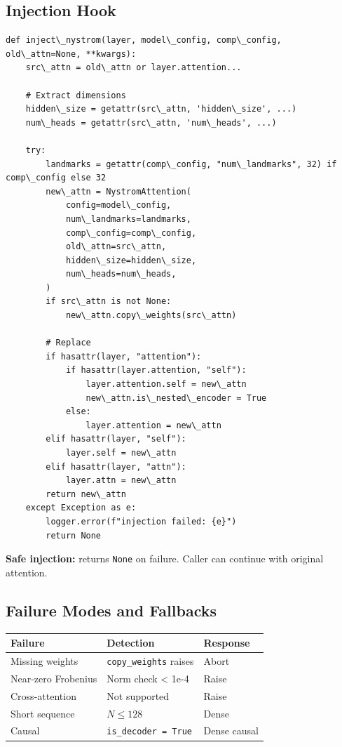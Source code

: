 \subsection{Injection Hook}

\begin{lstlisting}
def inject\_nystrom(layer, model\_config, comp\_config, old\_attn=None, **kwargs):
    src\_attn = old\_attn or layer.attention...
    
    # Extract dimensions
    hidden\_size = getattr(src\_attn, 'hidden\_size', ...)
    num\_heads = getattr(src\_attn, 'num\_heads', ...)
    
    try:
        landmarks = getattr(comp\_config, "num\_landmarks", 32) if comp\_config else 32
        new\_attn = NystromAttention(
            config=model\_config,
            num\_landmarks=landmarks,
            comp\_config=comp\_config,
            old\_attn=src\_attn,
            hidden\_size=hidden\_size,
            num\_heads=num\_heads,
        )
        if src\_attn is not None:
            new\_attn.copy\_weights(src\_attn)
        
        # Replace
        if hasattr(layer, "attention"):
            if hasattr(layer.attention, "self"):
                layer.attention.self = new\_attn
                new\_attn.is\_nested\_encoder = True
            else:
                layer.attention = new\_attn
        elif hasattr(layer, "self"):
            layer.self = new\_attn
        elif hasattr(layer, "attn"):
            layer.attn = new\_attn
        return new\_attn
    except Exception as e:
        logger.error(f"injection failed: {e}")
        return None
\end{lstlisting}

\textbf{Safe injection:} returns \texttt{None} on failure. Caller can continue with 
original attention.

\subsection{Failure Modes and Fallbacks}

\begin{table}[H]
\centering
\small
\begin{tabular}{lll}
\toprule
\textbf{Failure} & \textbf{Detection} & \textbf{Response} \\
\midrule
Missing weights & \texttt{copy\_weights} raises & Abort \\
Near-zero Frobenius & Norm check \textless{} 1e-4 & Raise \\
Cross-attention & Not supported & Raise \\
Short sequence & $N \leq 128$ & Dense \\
Causal & \texttt{is\_decoder = True} & Dense causal \\
\bottomrule
\end{tabular}
\end{table}

